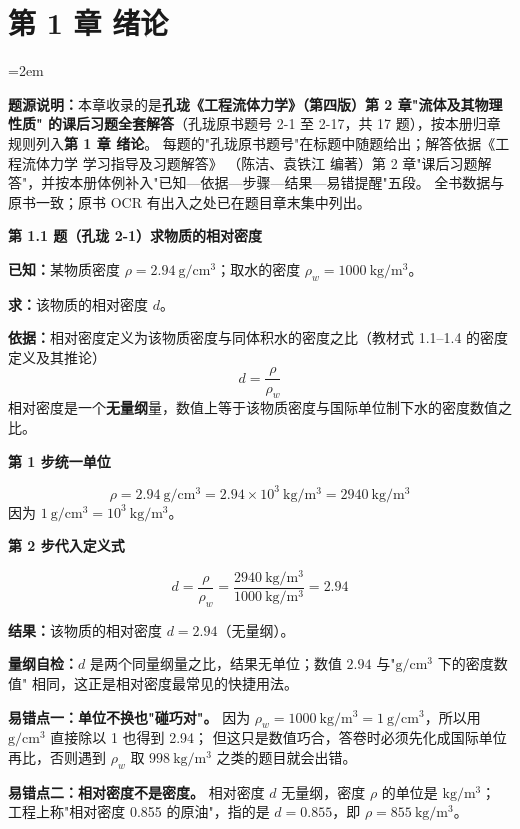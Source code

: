 \chapter*{第 1 章 绪论}


\sloppy
\emergencystretch=2em

\begin{tishi}
\textbf{题源说明：}本章收录的是\textbf{孔珑《工程流体力学》（第四版）第 2 章"流体及其物理性质"
的课后习题全套解答}（孔珑原书题号 2-1 至 2-17，共 17 题），按本册归章规则列入\textbf{第 1 章 绪论}。
每题的"孔珑原书题号"在标题中随题给出；解答依据《工程流体力学 学习指导及习题解答》
（陈洁、袁铁江 编著）第 2 章"课后习题解答"，并按本册体例补入"已知—依据—步骤—结果—易错提醒"五段。
全书数据与原书一致；原书 OCR 有出入之处已在题目章末集中列出。
\end{tishi}

\noindent\textbf{第 1.1 题（孔珑 2-1）\quad 求物质的相对密度}

\begin{jie}
\textbf{已知：}某物质密度 $\rho=2.94\ \mathrm{g/cm^3}$；取水的密度 $\rho_w=1000\ \mathrm{kg/m^3}$。

\textbf{求：}该物质的相对密度 $d$。

\textbf{依据：}相对密度定义为该物质密度与同体积水的密度之比（教材式 1.1--1.4 的密度定义及其推论）
\[ d=\frac{\rho}{\rho_w} \]
相对密度是一个\textbf{无量纲}量，数值上等于该物质密度与国际单位制下水的密度数值之比。

\textbf{第 1 步\quad 统一单位}

\[ \rho=2.94\ \mathrm{g/cm^3}=2.94\times10^{3}\ \mathrm{kg/m^3}=2940\ \mathrm{kg/m^3} \]
因为 $1\ \mathrm{g/cm^3}=10^{3}\ \mathrm{kg/m^3}$。

\textbf{第 2 步\quad 代入定义式}

\[ d=\frac{\rho}{\rho_w}=\frac{2940\ \mathrm{kg/m^3}}{1000\ \mathrm{kg/m^3}}=2.94 \]

\textbf{结果：}该物质的相对密度 $d=2.94$（无量纲）。

\textbf{量纲自检：}$d$ 是两个同量纲量之比，结果无单位；数值 $2.94$ 与"$\mathrm{g/cm^3}$ 下的密度数值"
相同，这正是相对密度最常见的快捷用法。
\end{jie}

\begin{yicuo}
\textbf{易错点一：单位不换也"碰巧对"。}
因为 $\rho_w=1000\ \mathrm{kg/m^3}=1\ \mathrm{g/cm^3}$，所以用 $\mathrm{g/cm^3}$ 直接除以 1 也得到 2.94；
但这只是数值巧合，答卷时必须先化成国际单位再比，否则遇到 $\rho_w$ 取 $998\ \mathrm{kg/m^3}$ 之类的题目就会出错。

\textbf{易错点二：相对密度不是密度。}
相对密度 $d$ 无量纲，密度 $\rho$ 的单位是 $\mathrm{kg/m^3}$；
工程上称"相对密度 0.855 的原油"，指的是 $d=0.855$，即 $\rho=855\ \mathrm{kg/m^3}$。
\end{yicuo}

